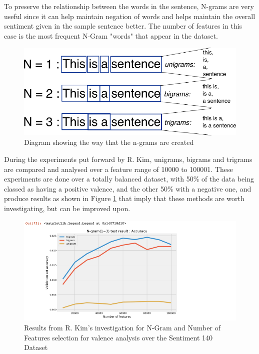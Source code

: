 To preserve the relationship between the words in the sentence, N-grams are very useful since it can help maintain negation of words and helps maintain the overall sentiment given in the sample sentence better. The number of features in this case is the most frequent N-Gram "words" that appear in the dataset.

\begin{figure}[h]
\centering
\includegraphics[scale=0.5]{litImgs/ngrams.png}
\caption{Diagram showing the way that the n-grams are created}
\end{figure}


During the experiments put forward by R. Kim, unigrams, bigrams and trigrams are compared and analysed over a feature range of 10000 to 100001. These experiments are done over a totally balanced dataset, with 50\% of the data being classed as having a positive valence, and the other 50\% with a negative one, and produce results as shown in Figure \ref{towards:DS} that imply that these methods are worth investigating, but can be improved upon.

\begin{figure}[h]
\centering
\includegraphics[scale=0.5]{litImgs/towardsDSNgramNFeatures.png}
\caption{Results from R. Kim's investigation for N-Gram and Number of Features selection for valence analysis over the Sentiment 140 Dataset \cite{go2016sentiment140}}
\label{towards:DS}
\end{figure}

